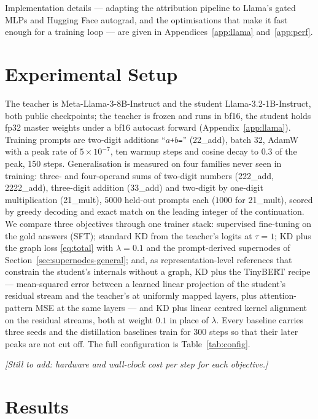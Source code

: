 \documentclass{article}
\newcommand{\todosec}[1]{{\color{Gray}\emph{[#1]}}}
\begin{document}
Implementation details --- adapting the attribution pipeline to Llama's gated MLPs and Hugging Face
autograd, and the optimisations that make it fast enough for a training loop --- are given in
Appendices~\ref{app:llama} and~\ref{app:perf}.

\section{Experimental Setup}
\label{sec:setup}

The teacher is Meta-Llama-3-8B-Instruct and the student Llama-3.2-1B-Instruct, both public
checkpoints; the teacher is frozen and runs in bf16, the student holds fp32 master weights under a
bf16 autocast forward (Appendix~\ref{app:llama}). Training prompts are two-digit additions
``\texttt{$a$+$b$=}'' (22\_add), batch 32, AdamW with a peak rate of $5 \times 10^{-7}$, ten
warmup steps and cosine decay to $0.3$ of the peak, 150 steps.
Generalisation is measured on four families never seen in training: three- and four-operand sums
of two-digit numbers (222\_add, 2222\_add), three-digit addition (33\_add) and two-digit by
one-digit multiplication (21\_mult), $5000$ held-out prompts each ($1000$ for 21\_mult), scored by
greedy decoding and exact match on the leading integer of the continuation. We compare three
objectives through one trainer stack: supervised fine-tuning on the gold answers (SFT); standard
KD from the teacher's logits at $\tau = 1$; KD plus the graph loss \eqref{eq:total} with
$\lambda = 0.1$ and the prompt-derived supernodes of Section~\ref{sec:supernodes-general}; and,
as representation-level references that constrain the student's internals without a graph, KD
plus the TinyBERT recipe \citep{jiao2020tinybert} --- mean-squared error between a learned linear
projection of the student's residual stream and the teacher's at uniformly mapped layers, plus
attention-pattern MSE at the same layers --- and KD plus linear centred kernel alignment
\citep{kornblith2019similarity} on the residual streams, both at weight $0.1$ in place of $\lambda$. Every
baseline carries three seeds and the distillation baselines train for 300 steps so that their
later peaks are not cut off. The full configuration is Table~\ref{tab:config}.

\todosec{Still to add: hardware and wall-clock cost per step for each objective.}

\section{Results}
\label{sec:results}
\end{document}
